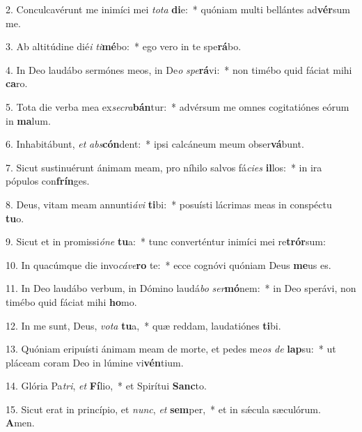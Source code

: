 2. Conculcavérunt me inimíci mei \textit{to}\textit{ta} \textbf{di}e:~*  quóniam multi bellántes ad\textbf{vér}sum me.\

3. Ab altitúdine dié\textit{i} \textit{ti}\textbf{mé}bo:~*  ego vero in te spe\textbf{rá}bo.\

4. In Deo laudábo sermónes meos, in De\textit{o} \textit{spe}\textbf{rá}vi:~*  non timébo quid fáciat mihi \textbf{ca}ro.\

5. Tota die verba mea ex\textit{se}\textit{cra}\textbf{bán}tur:~*  advérsum me omnes cogitatiónes eórum in \textbf{ma}lum.\

6. Inhabitábunt, \textit{et} \textit{abs}\textbf{cón}dent:~*  ipsi calcáneum meum obser\textbf{vá}bunt.\

7. Sicut sustinuérunt ánimam meam, pro níhilo salvos fá\textit{ci}\textit{es} \textbf{il}los:~*  in ira pópulos con\textbf{frín}ges.\

8. Deus, vitam meam annunti\textit{á}\textit{vi} \textbf{ti}bi:~*  posuísti lácrimas meas in conspéctu \textbf{tu}o.\

9. Sicut et in promissi\textit{ó}\textit{ne} \textbf{tu}a:~*  tunc converténtur inimíci mei re\textbf{trór}sum:\

10. In quacúmque die invo\textit{cá}\textit{ve}\textbf{ro} te:~*  ecce cognóvi quóniam Deus \textbf{me}us es.\

11. In Deo laudábo verbum, in Dómino laudá\textit{bo} \textit{ser}\textbf{mó}nem:~*  in Deo sperávi, non timébo quid fáciat mihi \textbf{ho}mo.\

12. In me sunt, Deus, \textit{vo}\textit{ta} \textbf{tu}a,~*  quæ reddam, laudatiónes \textbf{ti}bi.\

13. Quóniam eripuísti ánimam meam de morte, et pedes me\textit{os} \textit{de} \textbf{lap}su:~*  ut pláceam coram Deo in lúmine vi\textbf{vén}tium.\

14. Glória Pa\textit{tri}, \textit{et} \textbf{Fí}lio,~*  et Spirítui \textbf{Sanc}to.\

15. Sicut erat in princípio, et \textit{nunc}, \textit{et} \textbf{sem}per,~*  et in sǽcula sæculórum. \textbf{A}men.\

